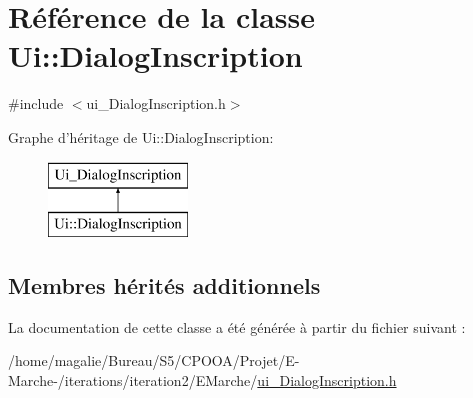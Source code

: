 \hypertarget{class_ui_1_1_dialog_inscription}{\section{Référence de la classe Ui\-:\-:Dialog\-Inscription}
\label{class_ui_1_1_dialog_inscription}
}


{\ttfamily \#include $<$ui\-\_\-\-Dialog\-Inscription.\-h$>$}

Graphe d'héritage de Ui\-:\-:Dialog\-Inscription\-:\begin{figure}[H]
\begin{center}
\leavevmode
\includegraphics[height=2.000000cm]{class_ui_1_1_dialog_inscription}
\end{center}
\end{figure}
\subsection*{Membres hérités additionnels}


La documentation de cette classe a été générée à partir du fichier suivant \-:\begin{DoxyCompactItemize}
\item 
/home/magalie/\-Bureau/\-S5/\-C\-P\-O\-O\-A/\-Projet/\-E-\/\-Marche-\//iterations/iteration2/\-E\-Marche/\hyperlink{ui___dialog_inscription_8h}{ui\-\_\-\-Dialog\-Inscription.\-h}\end{DoxyCompactItemize}
